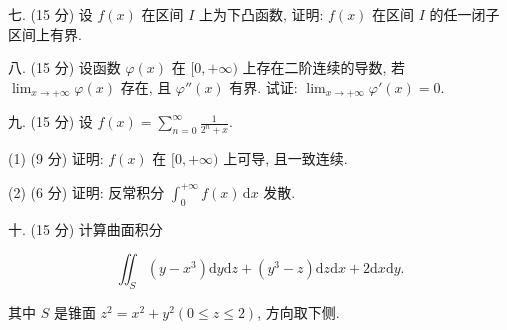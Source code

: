 \documentclass{examcollection}
\renewcommand{\displayformula}[1]{\[#1\]}
\begin{document}
{\begin{minipage}{\textwidth}
七. (15 分) 设 $f(x)$ 在区间 $I$ 上为下凸函数, 证明: $f(x)$ 在区间 $I$ 的任一闭子区间上有界.\par
八. (15 分) 设函数 $\varphi(x)$ 在 $[0, +\infty)$ 上存在二阶连续的导数, 若 $\lim_{x \to +\infty} \varphi(x)$ 存在, 且 $\varphi''(x)$ 有界. 试证: $\lim_{x \to +\infty} \varphi'(x) = 0$.\par
九. (15 分) 设 $f(x) = \sum_{n=0}^{\infty} \frac{1}{2^n + x}$.\par
(1) (9 分) 证明: $f(x)$ 在 $[0, +\infty)$ 上可导, 且一致连续.\par
(2) (6 分) 证明: 反常积分 $\int_{0}^{+\infty} f(x) \, \mathrm{d}x$ 发散.\par
十. (15 分) 计算曲面积分\par
\displayformula{\iint_ {S} \left(y - x ^ {3}\right) \mathrm{d} y \mathrm{d} z + \left(y ^ {3} - z\right) \mathrm{d} z \mathrm{d} x + 2 \mathrm{d} x \mathrm{d} y.}\par
其中 $S$ 是锥面 $z^2 = x^2 + y^2 (0 \leq z \leq 2)$, 方向取下侧.\par
\end{minipage}}
\ifdim\dimexpr\ht\proofbox+\dp\proofbox\relax>\textheight
\noindent\resizebox{!}{\textheight}{\usebox{\proofbox}}\else\noindent\usebox{\proofbox}\fi\clearpage
\end{document}
